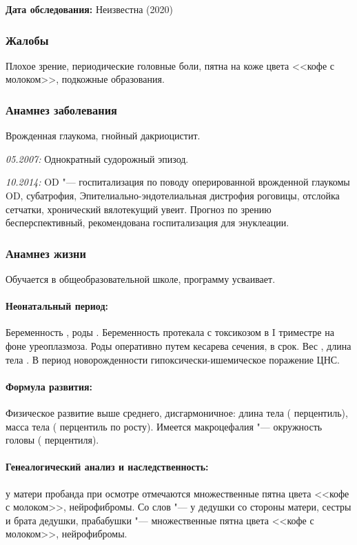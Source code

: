\documentclass[a4paper,14pt]{extarticle}
\newcommand{\kilogramm}{кг}
\newcommand{\gramm}{г}
\newcommand{\cm}{см}
\newcommand{\pdate}[1]{\emph{#1:} }
\begin{document}
\textbf{Дата обследования:} Неизвестна (2020)

\subsubsection*{Жалобы}

Плохое зрение, периодические головные боли, пятна на коже цвета <<кофе с молоком>>, подкожные образования.

\subsubsection*{Анамнез заболевания}

Врожденная глаукома, гнойный дакриоцистит.

\pdate{05.2007} Однократный судорожный эпизод.

\pdate{10.2014} OD "--- госпитализация по поводу оперированной врожденной глаукомы OD, субатрофия, 
Эпителиально-эндотелиальная дистрофия роговицы, отслойка сетчатки, хронический вялотекущий увеит.
Прогноз по зрению бесперспективный, рекомендована госпитализация для энуклеации.

\subsubsection*{Анамнез жизни}

Обучается в общеобразовательной школе, программу усваивает.

\paragraph{Неонатальный период:} Беременность , роды . Беременность протекала с токсикозом в I триместре на фоне уреоплазмоза. Роды оперативно путем кесарева сечения, в срок. Вес \numprint[\gramm]{4040}, длина тела \numprint[\cm]{53}. В период новорожденности гипоксически\hyp{}ишемическое поражение ЦНС.

\paragraph{Формула развития:} Физическое развитие выше среднего, дисгармоничное: длина тела \numprint[\cm]{154} ( перцентиль), масса тела \numprint[\kilogramm]{54} ( перцентиль по росту). Имеется макроцефалия "--- окружность головы \numprint[\cm]{59} ( перцентиля). 

\paragraph{Генеалогический анализ и наследственность:} у матери пробанда при осмотре отмечаются множественные пятна цвета <<кофе с молоком>>, нейрофибромы. Со слов "--- у дедушки со стороны матери, сестры и брата дедушки, прабабушки "--- множественные пятна цвета <<кофе с молоком>>, нейрофибромы.
\end{document}
